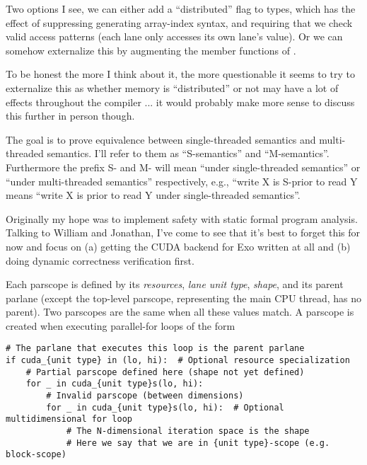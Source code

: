 \filbreak
{} Two options I see, we can either add a ``distributed'' flag to  types, which has the effect of suppressing generating array-index syntax, and requiring that we check valid access patterns (each lane only accesses its own lane's value). Or we can somehow externalize this by augmenting the member functions of .

To be honest the more I think about it, the more questionable it seems to try to externalize this as whether memory is ``distributed'' or not may have a lot of effects throughout the compiler ... it would probably make more sense to discuss this further in person though.

\newpage
{}

The goal is to prove equivalence between single-threaded semantics and multi-threaded semantics.
I'll refer to them as ``S-semantics'' and ``M-semantics''.
Furthermore the prefix S- and M- will mean ``under single-threaded semantics'' or ``under multi-threaded semantics'' respectively, e.g., ``write X is S-prior to read Y means ``write X is prior to read Y under single-threaded semantics''.

Originally my hope was to implement safety with static formal program analysis.
Talking to William and Jonathan, I've come to see that it's best to forget this for now and focus on (a) getting the CUDA backend for Exo written at all and (b) doing dynamic correctness verification first.

\filbreak
{}

\filbreak
{} Each parscope is defined by its \textit{resources}, \textit{lane unit type}, \textit{shape}, and its parent parlane (except the top-level parscope, representing the main CPU thread, has no parent). Two parscopes are the same when all these values match. A parscope is created when executing parallel-for loops of the form

{\color{lightttColor}
\begin{verbatim}
# The parlane that executes this loop is the parent parlane
if cuda_{unit type} in (lo, hi):  # Optional resource specialization
    # Partial parscope defined here (shape not yet defined)
    for _ in cuda_{unit type}s(lo, hi):
        # Invalid parscope (between dimensions)
        for _ in cuda_{unit type}s(lo, hi):  # Optional multidimensional for loop
            # The N-dimensional iteration space is the shape
            # Here we say that we are in {unit type}-scope (e.g. block-scope)
\end{verbatim}
}

